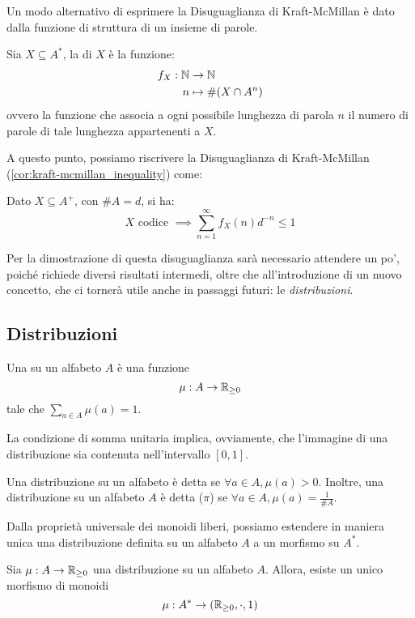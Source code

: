 Un modo alternativo di esprimere la Disuguaglianza di Kraft-McMillan è dato dalla funzione di struttura di un insieme di parole.
\begin{definition}
  Sia \(X \subseteq A^*\), la  di \(X\) è la funzione:
  \begin{equation*}
    \begin{aligned}
      f_X: \mathbb{N} &\to \mathbb{N} \\
      n &\mapsto \#(X \cap A^n)
    \end{aligned}
  \end{equation*}
  ovvero la funzione che associa a ogni possibile lunghezza di parola \(n\) il numero di parole di tale lunghezza appartenenti a \(X\).
\end{definition}

A questo punto, possiamo riscrivere la Disuguaglianza di Kraft-McMillan (\ref{cor:kraft-mcmillan_inequality}) come:
\begin{corollary}\label{cor:kraft-mcmillan_inequality_alt}
  Dato \(X \subseteq A^+\), con \(\# A = d\), si ha:
    \[X \text{ codice } \implies \sum_{n=1}^{\infty} f_X(n) d^{-n} \leq 1\]
\end{corollary}

Per la dimostrazione di questa disuguaglianza sarà necessario attendere un po', poiché richiede diversi risultati intermedi, oltre che all'introduzione di un nuovo concetto, che ci tornerà utile anche in passaggi futuri: le \emph{distribuzioni}.
\subsection{Distribuzioni}

\begin{definition}
  Una  su un alfabeto \(A\) è una funzione
    \[\mu: A \to \mathbb{R}_{\geq 0}\]
  tale che \(\sum_{a \in A} \mu(a) = 1\).
\end{definition}
La condizione di somma unitaria implica, ovviamente, che l'immagine di una distribuzione sia contenuta nell'intervallo \([0,1]\).

Una distribuzione su un alfabeto è detta  se \(\forall a \in A, \mu(a) > 0\).
Inoltre, una distribuzione su un alfabeto \(A\) è detta  (\(\pi\)) se \(\forall a \in A, \mu(a) = \frac{1}{\# A}\).

Dalla proprietà universale dei monoidi liberi, possiamo estendere in maniera unica una distribuzione definita su un alfabeto \(A\) a un morfismo su \(A^*\).
\begin{definition}
  Sia \(\mu: A \to \mathbb{R}_{\geq 0}\) una distribuzione su un alfabeto \(A\).
  Allora, esiste un unico morfismo di monoidi
    \[\mu: A^* \to (\mathbb{R}_{\geq 0}, \cdot, 1)\]
\end{definition}

